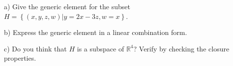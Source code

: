 \documentclass{article}
\begin{document}
\begin{flushleft}
\vspace{0.2in}

a) Give the generic element for the subset $H = \left\{ (x,y,z,w)| y = 2x - 3z, w=x \right\}$.

\vspace{1in}

b) Express the generic element in a linear combination form.

\vspace{2in}

c) Do you think that $H$ is a subspace of $\mathbb{R}^4$?  Verify by checking the closure properties.

\end{flushleft}
\end{document}
